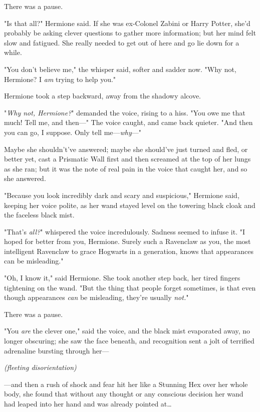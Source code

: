 There was a pause.

"Is that all?" Hermione said. If she was ex-Colonel Zabini or Harry Potter, 
she'd probably be asking clever questions to gather more information; but her 
mind felt slow and fatigued. She really needed to get out of here and go lie 
down for a while.

"You don't believe me," the whisper said, softer and sadder now. "Why not, 
Hermione? I \emph{am} trying to help you."

Hermione took a step backward, away from the shadowy alcove.

"\emph{Why not, Hermione?}" demanded the voice, rising to a hiss. "You owe me 
that much! Tell me, and then---" The voice caught, and came back quieter. "And 
then you can go, I suppose. Only tell me---\emph{why}---"

Maybe she shouldn't've answered; maybe she should've just turned and fled, or 
better yet, cast a Prismatic Wall first and then screamed at the top of her 
lungs as she ran; but it was the note of real pain in the voice that caught 
her, and so she answered.

"Because you look incredibly dark and scary and suspicious," Hermione said, 
keeping her voice polite, as her wand stayed level on the towering black cloak 
and the faceless black mist.

"That's \emph{all?}" whispered the voice incredulously. Sadness seemed to 
infuse it. "I hoped for better from you, Hermione. Surely such a Ravenclaw as 
you, the most intelligent Ravenclaw to grace Hogwarts in a generation, knows 
that appearances can be misleading."

"Oh, I know it," said Hermione. She took another step back, her tired fingers 
tightening on the wand. "But the thing that people forget sometimes, is that 
even though appearances \emph{can} be misleading, they're usually \emph{not.}"

There was a pause.

"You \emph{are} the clever one," said the voice, and the black mist evaporated 
away, no longer obscuring; she saw the face beneath, and recognition sent a 
jolt of terrified adrenaline bursting through her---

\emph{(fleeting disorientation)}

---and then a rush of shock and fear hit her like a Stunning Hex over her whole 
body, she found that without any thought or any conscious decision her wand had 
leaped into her hand and was already pointed at{\ldots}

